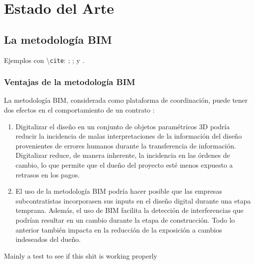 \chapter{Estado del Arte}

\section{La metodología BIM}

Ejemplos con \textbackslash \texttt{cite}: ; \cite{lu2014cost};  y .


\subsection{Ventajas de la metodología BIM}

La metodología BIM, considerada como plataforma de coordinación, puede tener dos efectos en el comportamiento de un contrato \cite{chang2014economic}: 
\begin{enumerate}
    \item Digitalizar el diseño en un conjunto de objetos paramétricos 3D podría reducir la incidencia de malas interpretaciones de la información del diseño provenientes de errores humanos durante la transferencia de información. Digitalizar reduce, de manera inherente, la incidencia en las órdenes de cambio, lo que permite que el dueño del proyecto esté menos expuesto a retrasos en los pagos.
    \item El uso de la metodología BIM podría hacer posible que las empresas subcontratistas incorporasen sus inputs en el diseño digital durante una etapa temprana. Además, el uso de BIM facilita la detección de interferencias que podrían resultar en un cambio durante la etapa de construcción. Todo lo anterior también impacta en la reducción de la exposición a cambios indeseados del dueño.
\end{enumerate}


Mainly a test to see if this shit is working properly
